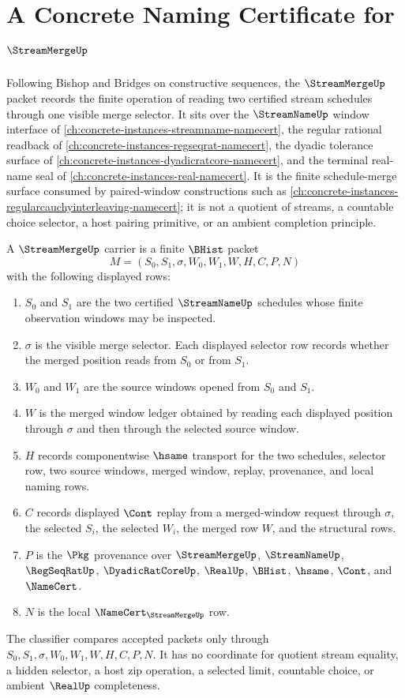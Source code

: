 \chapter{A Concrete Naming Certificate for $\StreamMergeUp$}
\label{ch:concrete-instances-stream-merge-namecert}

Following Bishop and Bridges on constructive sequences, the $\StreamMergeUp$ packet records the finite operation of reading two certified stream schedules through one visible merge selector. It sits over the $\StreamNameUp$ window interface of \autoref{ch:concrete-instances-streamname-namecert}, the regular rational readback of \autoref{ch:concrete-instances-regseqrat-namecert}, the dyadic tolerance surface of \autoref{ch:concrete-instances-dyadicratcore-namecert}, and the terminal real-name seal of \autoref{ch:concrete-instances-real-namecert}. It is the finite schedule-merge surface consumed by paired-window constructions such as \autoref{ch:concrete-instances-regularcauchyinterleaving-namecert}; it is not a quotient of streams, a countable choice selector, a host pairing primitive, or an ambient completion principle.

\begin{definition}
\label{def:stream-merge-carrier}
A $\StreamMergeUp$ carrier is a finite $\BHist$ packet
$$
M=(S_0,S_1,\sigma,W_0,W_1,W,H,C,P,N)
$$
with the following displayed rows:
\begin{enumerate}
\item $S_0$ and $S_1$ are the two certified $\StreamNameUp$ schedules whose finite observation windows may be inspected.
\item $\sigma$ is the visible merge selector. Each displayed selector row records whether the merged position reads from $S_0$ or from $S_1$.
\item $W_0$ and $W_1$ are the source windows opened from $S_0$ and $S_1$.
\item $W$ is the merged window ledger obtained by reading each displayed position through $\sigma$ and then through the selected source window.
\item $H$ records componentwise $\hsame$ transport for the two schedules, selector row, two source windows, merged window, replay, provenance, and local naming rows.
\item $C$ records displayed $\Cont$ replay from a merged-window request through $\sigma$, the selected $S_i$, the selected $W_i$, the merged row $W$, and the structural rows.
\item $P$ is the $\Pkg$ provenance over $\StreamMergeUp$, $\StreamNameUp$, $\RegSeqRatUp$, $\DyadicRatCoreUp$, $\RealUp$, $\BHist$, $\hsame$, $\Cont$, and $\NameCert$.
\item $N$ is the local $\NameCert_{\StreamMergeUp}$ row.
\end{enumerate}
The classifier compares accepted packets only through $S_0,S_1,\sigma,W_0,W_1,W,H,C,P,N$. It has no coordinate for quotient stream equality, a hidden selector, a host zip operation, a selected limit, countable choice, or ambient $\RealUp$ completeness.
\end{definition}

